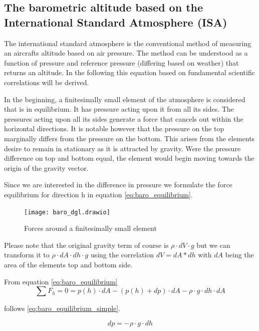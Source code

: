 \subsection{The barometric altitude based on the International Standard Atmosphere (ISA) \cite{iso_standard_1975}}

The international standard atmosphere is the conventional method of measuring an aircrafts altitude based on air pressure. The method can be understood as a function of pressure and reference pressure (differing based on weather) that returns an altitude. In the following this equation based on fundamental scientific correlations will be derived.

In the beginning, a finitesimally small element of the atmosphere is considered that is in equilibrium. It has pressure acting upon it from all its sides. The pressures acting upon all its sides generate a force that cancels out within the horizontal directions. It is notable however that the pressure on the top marginally differs from the pressure on the bottom. This arises from the elements desire to remain in stationary as it is attracted by gravity. Were the pressure difference on top and bottom equal, the element would begin moving towards the origin of the gravity vector.

Since we are interested in the difference in pressure we formulate the force equilibrium for direction h in equation \ref{eq:baro_equilibrium}.


\begin{figure}[h]
    \centering
    \texttt{[image: baro\_dgl.drawio]}
    \caption{Forces around a finitesimally small element}
    \label{fig:baro_FE}
\end{figure}


Please note that the original gravity term of course is $\rho \cdot dV \cdot g$ but we can transform it to $\rho \cdot dA \cdot dh \cdot g$ using the correlation $dV = dA * dh$ with $dA$ being the area of the elements top and bottom side.

From equation \ref{eq:baro_equilibrium}
\begin{equation}
    \sum{F_h} = 0 = p(h) \cdot dA - ( p(h) + dp )\cdot dA -  \rho \cdot g \cdot  dh \cdot dA
    \label{eq:baro_equilibrium}
\end{equation}

follows \ref{eq:baro_equilibrium_simple}.

\begin{equation}
    dp=-\rho \cdot g\cdot dh
    \label{eq:baro_equilibrium_simple}
\end{equation}

